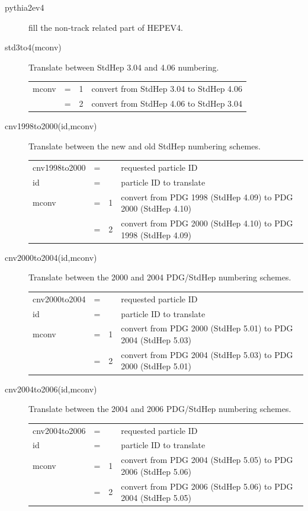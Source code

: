 \begin{description}
\item[pythia2ev4]  fill the non-track related part of HEPEV4.

\item[std3to4(mconv)] Translate between StdHep 3.04 and 4.06 numbering.

\begin{tabular}{lcll}
mconv & = & 1 & convert from StdHep 3.04 to StdHep 4.06 \\
      & = & 2 & convert from StdHep 4.06 to StdHep 3.04 \\
\end{tabular}

\item[cnv1998to2000(id,mconv)] Translate between the new and old StdHep numbering schemes.

\begin{tabular}{lcll}
cnv1998to2000 & = &   & requested particle ID \\
id            & = &   & particle ID to translate \\
mconv         & = & 1 & convert from PDG 1998 (StdHep 4.09) to PDG 2000 (StdHep 4.10)  \\
              & = & 2 & convert from PDG 2000 (StdHep 4.10) to PDG 1998 (StdHep 4.09)  \\
\end{tabular}

\item[cnv2000to2004(id,mconv)] Translate between the 2000 and 2004 PDG/StdHep numbering schemes.

\begin{tabular}{lcll}
cnv2000to2004 & = &   & requested particle ID \\
id            & = &   & particle ID to translate \\
mconv         & = & 1 & convert from PDG 2000 (StdHep 5.01) to PDG 2004 (StdHep 5.03)  \\
              & = & 2 & convert from PDG 2004 (StdHep 5.03) to PDG 2000 (StdHep 5.01)  \\
\end{tabular}

\item[cnv2004to2006(id,mconv)] Translate between the 2004 and 2006 PDG/StdHep numbering schemes.

\begin{tabular}{lcll}
cnv2004to2006 & = &   & requested particle ID \\
id            & = &   & particle ID to translate \\
mconv         & = & 1 & convert from PDG 2004 (StdHep 5.05) to PDG 2006 (StdHep 5.06)  \\
              & = & 2 & convert from PDG 2006 (StdHep 5.06) to PDG 2004 (StdHep 5.05)  \\
\end{tabular}


\end{description}
